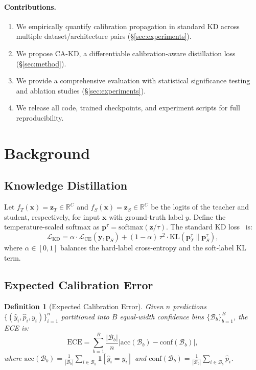 \documentclass{article}
\newtheorem{definition}{Definition}
\newcommand{\cL}{\mathcal{L}}
\newcommand{\KL}{\mathrm{KL}}
\newcommand{\ECE}{\mathrm{ECE}}
\newcommand{\softmax}{\mathrm{softmax}}
\newcommand{\abs}[1]{\left|#1\right|}
\begin{document}
\paragraph{Contributions.}
\begin{enumerate}
  \item We empirically quantify calibration propagation in standard KD across multiple
        dataset/architecture pairs (\S\ref{sec:experiments}).
  \item We propose CA-KD, a differentiable calibration-aware distillation loss
        (\S\ref{sec:method}).
  \item We provide a comprehensive evaluation with statistical significance testing and
        ablation studies (\S\ref{sec:experiments}).
  \item We release all code, trained checkpoints, and experiment scripts for full
        reproducibility.
\end{enumerate}

\section{Background}
\label{sec:background}

\subsection{Knowledge Distillation}

Let $f_T(\mathbf{x}) = \mathbf{z}_T \in \mathbb{R}^C$ and
$f_S(\mathbf{x}) = \mathbf{z}_S \in \mathbb{R}^C$ be the logits of the teacher and student,
respectively, for input $\mathbf{x}$ with ground-truth label $y$.
Define the temperature-scaled softmax as
$\mathbf{p}^\tau = \softmax(\mathbf{z}/\tau)$.
The standard KD loss~\citep{hinton2015distilling} is:
\begin{equation}
  \cL_\text{KD}
  = \alpha \cdot \cL_\text{CE}(\mathbf{y}, \mathbf{p}_S)
  + (1 - \alpha)\,\tau^2 \cdot \KL(\mathbf{p}_T^\tau \| \mathbf{p}_S^\tau),
  \label{eq:kd}
\end{equation}
where $\alpha \in [0,1]$ balances the hard-label cross-entropy and the soft-label KL term.

\subsection{Expected Calibration Error}

\begin{definition}[Expected Calibration Error]
Given $n$ predictions $\{(\hat{y}_i, \hat{p}_i, y_i)\}_{i=1}^n$ partitioned into $B$ equal-width
confidence bins $\{\mathcal{B}_b\}_{b=1}^B$, the ECE is:
\begin{equation}
  \ECE = \sum_{b=1}^{B} \frac{|\mathcal{B}_b|}{n}
         \abs{\mathrm{acc}(\mathcal{B}_b) - \mathrm{conf}(\mathcal{B}_b)},
\end{equation}
where $\mathrm{acc}(\mathcal{B}_b) = \frac{1}{|\mathcal{B}_b|}\sum_{i \in \mathcal{B}_b}
\mathbf{1}[\hat{y}_i = y_i]$ and
$\mathrm{conf}(\mathcal{B}_b) = \frac{1}{|\mathcal{B}_b|}\sum_{i \in \mathcal{B}_b} \hat{p}_i$.
\end{definition}
\end{document}

